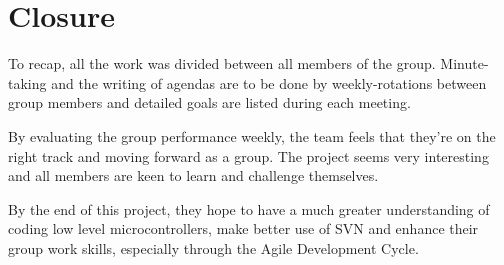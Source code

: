\documentclass[11pt,a4paper,twocolumn]{article}
\begin{document}
\section{Closure}

\par{To recap, all the work was divided between all members of the group. Minute-taking and the writing
of agendas are to be done by weekly-rotations between group members and detailed goals are
listed during each meeting.
}
\newline
\par{By evaluating the group performance weekly, the team feels that they're on the right track and
moving forward as a group. The project seems very interesting and all members are keen to learn
and challenge themselves.}
\newline
\par{By the end of this project, they hope to have a much greater understanding of coding low level
microcontrollers, make better use of SVN and enhance their group work skills, especially through the
Agile Development Cycle.}



\end{document}
